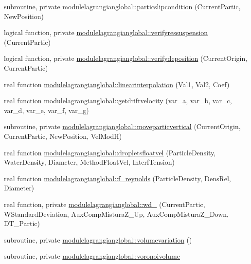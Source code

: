\begin{DoxyCompactItemize}
\item 
subroutine, private \mbox{\hyperlink{namespacemodulelagrangianglobal_a59c3bacd80d2e9730bbf1bae5ae46304}{modulelagrangianglobal\+::particslipcondition}} (Current\+Partic, New\+Position)
\item 
logical function, private \mbox{\hyperlink{namespacemodulelagrangianglobal_a690a5144506cf803e45f92de5eea31d7}{modulelagrangianglobal\+::verifyressuspension}} (Current\+Partic)
\item 
logical function, private \mbox{\hyperlink{namespacemodulelagrangianglobal_ac2e61e57ce9a9bd0aef7e60998c77a7b}{modulelagrangianglobal\+::verifydeposition}} (Current\+Origin, Current\+Partic)
\item 
real function \mbox{\hyperlink{namespacemodulelagrangianglobal_a0ac32542f936be812fbc775e622588ce}{modulelagrangianglobal\+::linearinterpolation}} (Val1, Val2, Coef)
\item 
real function \mbox{\hyperlink{namespacemodulelagrangianglobal_a51b510de4fae6141e3b324bc961177d9}{modulelagrangianglobal\+::getdriftvelocity}} (var\+\_\+a, var\+\_\+b, var\+\_\+c, var\+\_\+d, var\+\_\+e, var\+\_\+f, var\+\_\+g)
\item 
subroutine, private \mbox{\hyperlink{namespacemodulelagrangianglobal_abff124f5f5744390bce7f4e2ca7b33a4}{modulelagrangianglobal\+::moveparticvertical}} (Current\+Origin, Current\+Partic, New\+Position, Vel\+ModH)
\item 
real function \mbox{\hyperlink{namespacemodulelagrangianglobal_a2080e5fc3db1ae9253fe08012623e1bf}{modulelagrangianglobal\+::dropletsfloatvel}} (Particle\+Density, Water\+Density, Diameter, Method\+Float\+Vel, Interf\+Tension)
\item 
real function \mbox{\hyperlink{namespacemodulelagrangianglobal_abb6d8c7acaf1915a70609c5d8763d229}{modulelagrangianglobal\+::f\+\_\+reynolds}} (Particle\+Density, Dens\+Rel, Diameter)
\item 
real function, private \mbox{\hyperlink{namespacemodulelagrangianglobal_a89664f3ed8eeda5bbe36dc80afc53a89}{modulelagrangianglobal\+::wd\+\_\+}} (Current\+Partic, W\+Standard\+Deviation, Aux\+Comp\+Mistura\+Z\+\_\+\+Up, Aux\+Comp\+Mistura\+Z\+\_\+\+Down, D\+T\+\_\+\+Partic)
\item 
subroutine, private \mbox{\hyperlink{namespacemodulelagrangianglobal_af49b1a80eb0ff491949cf2b360fb430f}{modulelagrangianglobal\+::volumevariation}} ()
\item 
subroutine, private \mbox{\hyperlink{namespacemodulelagrangianglobal_a302b214901c2710b5755117530d28d20}{modulelagrangianglobal\+::voronoivolume}}

\end{DoxyCompactItemize}
